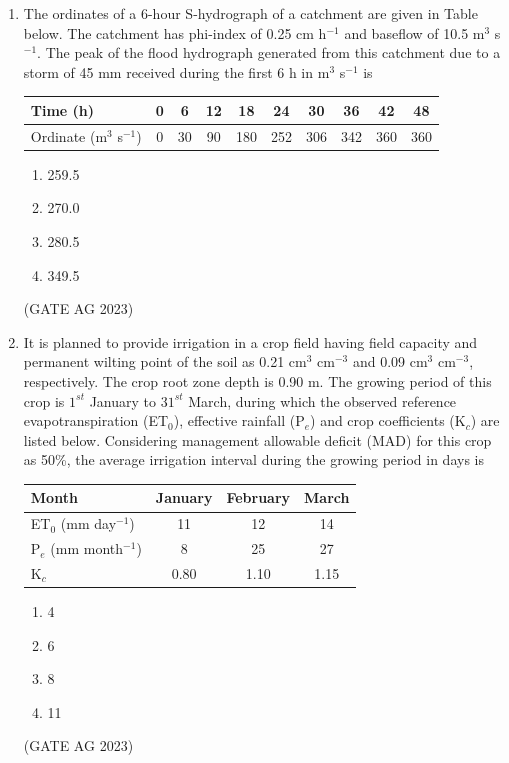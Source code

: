\documentclass[journal,12pt,onecolumn]{IEEEtran}
\theoremstyle{remark}
\begin{document}
\begin{enumerate}
    \item The ordinates of a 6-hour S-hydrograph of a catchment are given in Table below. The catchment has phi-index of 0.25 cm h$^{-1}$ and baseflow of 10.5 m$^{3}$ s$^{-1}$. The peak of the flood hydrograph generated from this catchment due to a storm of 45 mm received during the first 6 h in m$^{3}$ s$^{-1}$ is
    \begin{tabular}{|l|c|c|c|c|c|c|c|c|c|}
        \hline
        Time (h) & 0 & 6 & 12 & 18 & 24 & 30 & 36 & 42 & 48 \\
        \hline
        Ordinate (m$^{3}$ s$^{-1}$) & 0 & 30 & 90 & 180 & 252 & 306 & 342 & 360 & 360 \\
        \hline
    \end{tabular}
    \begin{multicols}{4}
    \begin{enumerate}
        \item 259.5
        \item 270.0
        \item 280.5
        \item 349.5
    \end{enumerate}
    \end{multicols}
\hfill{(GATE AG 2023)}

    \item It is planned to provide irrigation in a crop field having field capacity and permanent wilting point of the soil as 0.21 cm$^{3}$ cm$^{-3}$ and 0.09 cm$^{3}$ cm$^{-3}$, respectively. The crop root zone depth is 0.90 m. The growing period of this crop is $1^{st}$ January to $31^{st}$ March, during which the observed reference evapotranspiration (ET$_{0}$), effective rainfall (P$_{e}$) and crop coefficients (K$_{c}$) are listed below. Considering management allowable deficit (MAD) for this crop as 50\%, the average irrigation interval during the growing period in days is
    \begin{tabular}{|l|c|c|c|}
        \hline
        Month & January & February & March \\
        \hline
        ET$_{0}$ (mm day$^{-1}$) & 11 & 12 & 14 \\
        \hline
        P$_{e}$ (mm month$^{-1}$) & 8 & 25 & 27 \\
        \hline
        K$_{c}$ & 0.80 & 1.10 & 1.15 \\
        \hline
    \end{tabular}
    \begin{multicols}{4}
    \begin{enumerate}
        \item 4
        \item 6
        \item 8
        \item 11
    \end{enumerate}
    \end{multicols}
\hfill{(GATE AG 2023)}


\end{enumerate}
\end{document}
